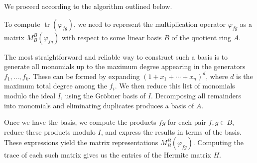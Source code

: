 \documentclass{amsart}
\begin{document}
We proceed according to the algorithm outlined below. 

To compute \( \operatorname{tr}(\varphi_{fg}) \), we need to represent the multiplication operator \( \varphi_{fg} \) as a matrix \( M_B^B(\varphi_{fg}) \) with respect to some linear basis \( B \) of the quotient ring \( A \).

The most straightforward and reliable way to construct such a basis is to generate all monomials up to the maximum degree appearing in the generators \( f_1, \ldots, f_k \). These can be formed by expanding \( (1 + x_1 + \cdots + x_n)^d \), where \( d \) is the maximum total degree among the \( f_i \). We then reduce this list of monomials modulo the ideal \( I \), using the Gröbner basis of \( I \). Decomposing all remainders into monomials and eliminating duplicates produces a basis of \( A \).

Once we have the basis, we compute the products \( fg \) for each pair \( f, g \in B \), reduce these products modulo \( I \), and express the results in terms of the basis. These expressions yield the matrix representations \( M_B^B(\varphi_{fg}) \). Computing the trace of each such matrix gives us the entries of the Hermite matrix \( H \).
\end{document}
